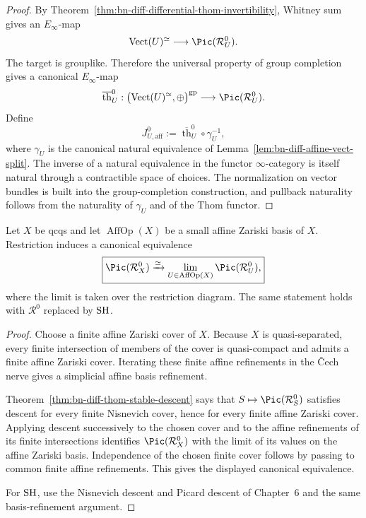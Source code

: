 \begin{proof}
By Theorem~\ref{thm:bn-diff-differential-thom-invertibility}, Whitney sum gives
an \(E_\infty\)-map
\[
  \operatorname{Vect}(U)^\simeq
  \longrightarrow
  \Pic(\mathcal R_U^0).
\]
The target is grouplike.  Therefore the universal property of group completion
gives a canonical \(E_\infty\)-map
\[
    \overline{\operatorname{th}}_U^0:
    \bigl(\operatorname{Vect}(U)^\simeq,\oplus\bigr)^{\mathrm{gp}}
    \longrightarrow
    \Pic(\mathcal R_U^0).
\]
Define
\[
    J_{U,\mathrm{aff}}^0
    :=
    \overline{\operatorname{th}}_U^0\circ\gamma_U^{-1},
\]
where $\gamma_U$ is the canonical natural equivalence of
Lemma~\ref{lem:bn-diff-affine-vect-split}.  The inverse of a natural
equivalence in the functor $\infty$-category is itself natural through a
contractible space of choices.  The normalization on vector bundles is built
into the group-completion construction, and pullback naturality follows from
the naturality of $\gamma_U$ and of the Thom functor.
\end{proof}

\begin{lemma}
\label{lem:bn-diff-affine-picard-descent}
Let \(X\) be qcqs and let \(\operatorname{AffOp}(X)\) be a small affine
Zariski basis of \(X\).  Restriction induces a canonical equivalence
\[
  \boxed{
  \Pic(\mathcal R_X^0)
  \xrightarrow{\simeq}
  \lim_{U\in\operatorname{AffOp}(X)}
  \Pic(\mathcal R_U^0),
  }
\]
where the limit is taken over the restriction diagram.  The same statement
holds with \(\mathcal R^0\) replaced by \(\mathrm{SH}\).
\end{lemma}

\begin{proof}
Choose a finite affine Zariski cover of \(X\).  Because \(X\) is
quasi-separated, every finite intersection of members of the cover is
quasi-compact and admits a finite affine Zariski cover.  Iterating these finite
affine refinements in the \v{C}ech nerve gives a simplicial affine basis
refinement.

Theorem~\ref{thm:bn-diff-thom-stable-descent} says that
\(S\mapsto\Pic(\mathcal R_S^0)\) satisfies descent for every finite
Nisnevich cover, hence for every finite affine Zariski cover.  Applying descent
successively to the chosen cover and to the affine refinements of its finite
intersections identifies \(\Pic(\mathcal R_X^0)\) with the limit of its values
on the affine Zariski basis.  Independence of the chosen finite cover follows
by passing to common finite affine refinements.  This gives the displayed
canonical equivalence.

For \(\mathrm{SH}\), use the Nisnevich descent and Picard descent of Chapter~6 and the
same basis-refinement argument.
\end{proof}

